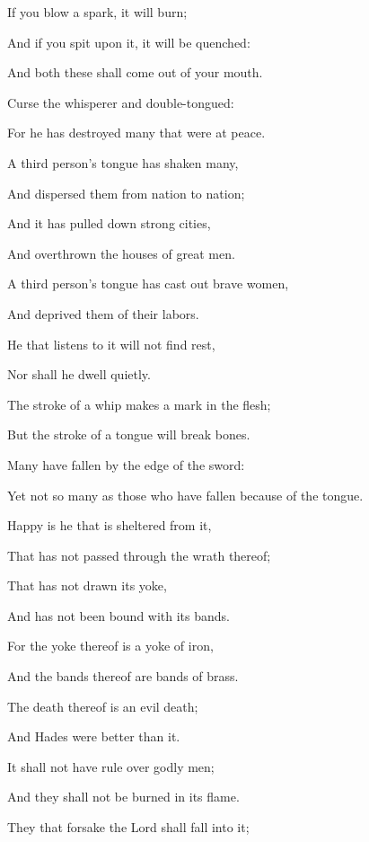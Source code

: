 {\par }{\Q {}If you blow a spark, it will burn;
\par }{\Q And if you spit upon it, it will be quenched:
\par }{\Q And both these shall come out of your mouth.
\par }{\BB \par }{\Q {}Curse the whisperer and double-tongued:
\par }{\Q For he has destroyed many that were at peace.
\par }{\Q {}A third person’s tongue has shaken many,
\par }{\Q And dispersed them from nation to nation;
\par }{\Q And it has pulled down strong cities,
\par }{\Q And overthrown the houses of great men.
\par }{\Q {}A third person’s tongue has cast out brave women,
\par }{\Q And deprived them of their labors.
\par }{\Q {}He that listens to it will not find rest,
\par }{\Q Nor shall he dwell quietly.
\par }{\Q {}The stroke of a whip makes a mark in the flesh;
\par }{\Q But the stroke of a tongue will break bones.
\par }{\Q {}Many have fallen by the edge of the sword:
\par }{\Q Yet not so many as those who have fallen because of the tongue.
\par }{\Q {}Happy is he that is sheltered from it,
\par }{\Q That has not passed through the wrath thereof;
\par }{\Q That has not drawn its yoke,
\par }{\Q And has not been bound with its bands.
\par }{\Q {}For the yoke thereof is a yoke of iron,
\par }{\Q And the bands thereof are bands of brass.
\par }{\Q {}The death thereof is an evil death;
\par }{\Q And Hades were better than it.
\par }{\Q {}It shall not have rule over godly men;
\par }{\Q And they shall not be burned in its flame.
\par }{\Q {}They that forsake the Lord shall fall into it;
}
